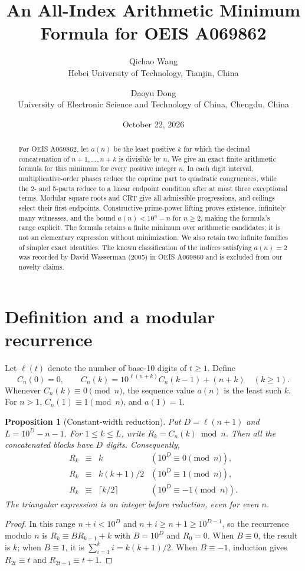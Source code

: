 \documentclass[10pt]{article}
\title{An All-Index Arithmetic Minimum Formula for OEIS A069862}
\author{Qichao Wang\\{\small Hebei University of Technology, Tianjin, China}\and
Daoyu Dong\\{\small University of Electronic Science and Technology of China, Chengdu, China}}
\date{October 22, 2026}
\newtheorem{proposition}{Proposition}
\begin{document}
\maketitle
\begin{abstract}
For OEIS A069862, let $a(n)$ be the least positive $k$ for which the decimal concatenation of $n+1,\ldots,n+k$ is divisible by $n$. We give an exact finite arithmetic formula for this minimum for every positive integer $n$. In each digit interval, multiplicative-order phases reduce the coprime part to quadratic congruences, while the 2- and 5-parts reduce to a linear endpoint condition after at most three exceptional terms. Modular square roots and CRT give all admissible progressions, and ceilings select their first endpoints. Constructive prime-power lifting proves existence, infinitely many witnesses, and the bound $a(n)<10^n-n$ for $n\ge2$, making the formula's range explicit. The formula retains a finite minimum over arithmetic candidates; it is not an elementary expression without minimization. We also retain two infinite families of simpler exact identities. The known classification of the indices satisfying $a(n)=2$ was recorded by David Wasserman (2005) in OEIS A069860 and is excluded from our novelty claims.
\end{abstract}
\section{Definition and a modular recurrence}
Let $\ell(t)$ denote the number of base-10 digits of $t\ge1$. Define
\[
 C_n(0)=0,\qquad C_n(k)=10^{\ell(n+k)}C_n(k-1)+(n+k)\quad(k\ge1).
\]
Whenever $C_n(k)\equiv0\pmod n$, the sequence value $a(n)$ is the least such $k$. For $n>1$, $C_n(1)\equiv1\pmod n$, and $a(1)=1$.
\begin{proposition}[Constant-width reduction]\label{prop:width}
Put $D=\ell(n+1)$ and $L=10^D-n-1$. For $1\le k\le L$, write $R_k=C_n(k)\bmod n$. Then all the concatenated blocks have $D$ digits. Consequently,
\[
 \begin{array}{rcll}
 R_k&\equiv& k &(10^D\equiv0\pmod n),\\
 R_k&\equiv&k(k+1)/2 &(10^D\equiv1\pmod n),\\
 R_k&\equiv&\lceil k/2\rceil &(10^D\equiv-1\pmod n).
 \end{array}
\]
The triangular expression is an integer before reduction, even for even $n$.
\end{proposition}
\begin{proof}
In this range $n+i<10^D$ and $n+i\ge n+1\ge10^{D-1}$, so the recurrence modulo $n$ is $R_k\equiv B R_{k-1}+k$ with $B=10^D$ and $R_0=0$. When $B\equiv0$, the result is $k$; when $B\equiv1$, it is $\sum_{i=1}^k i=k(k+1)/2$. When $B\equiv-1$, induction gives $R_{2t}\equiv t$ and $R_{2t+1}\equiv t+1$.
\end{proof}


\end{document}
